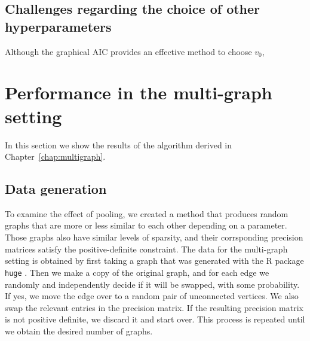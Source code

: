 \documentclass[a4paper, 11pt, oneside]{report}
\newcommand{\1}{\mathds{1}}
\begin{document}
\subsection{Challenges regarding the choice of other hyperparameters}
Although the graphical AIC provides an effective method to choose $v_0$, 

\section{Performance in the multi-graph setting}
In this section we show the results of the algorithm derived in Chapter~\ref{chap:multigraph}.

\subsection{Data generation}\label{ssect:data-generation}
To examine the effect of pooling, we created a method that produces random graphs that are more or less similar to each other depending on a parameter.
Those graphs also have similar levels of sparsity,
and their corrsponding precision matrices satisfy the positive-definite
constraint.
The data for the multi-graph setting is obtained by first taking a graph
that was generated with the R package \texttt{huge} \citep{huge2020}.
Then we make a copy of the original graph,
and for each edge we randomly and independently decide if it will be swapped, with some probability.
If yes, we move the edge over to a random pair of unconnected vertices.
We also swap the relevant entries in the precision matrix.
If the resulting precision matrix is not positive definite, we discard it and start over.
This process is repeated until we obtain the desired number of graphs.
\end{document}
